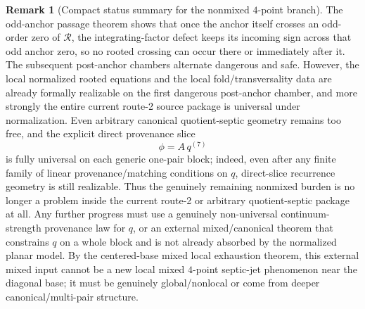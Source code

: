 \documentclass[11pt,a4paper]{amsart}
\theoremstyle{plain}
\theoremstyle{definition}
\newtheorem{remark}[theorem]{Remark}
\begin{document}
\begin{remark}[Compact status summary for the nonmixed $4$-point branch]
The odd-anchor passage theorem shows that once the anchor itself crosses an
odd-order zero of $\mathcal R$, the integrating-factor defect keeps its incoming
sign across that odd anchor zero, so no rooted crossing can occur there or
immediately after it. The subsequent post-anchor chambers alternate dangerous
and safe. However, the local normalized rooted equations and the local
fold/transversality data are already formally realizable on the first dangerous
post-anchor chamber, and more strongly the entire current route-2 source package
is universal under normalization. Even arbitrary canonical quotient-septic
geometry remains too free, and the explicit direct provenance slice
\[
\phi=A\,q^{(7)}
\]
is fully universal on each generic one-pair block; indeed, even after any
finite family of linear provenance/matching conditions on $q$, direct-slice
recurrence geometry is still realizable. Thus the genuinely remaining nonmixed
burden is no longer a problem inside the current route-2 or arbitrary
quotient-septic package at all. Any further progress must use a genuinely
non-universal continuum-strength provenance law for $q$, or an external
mixed/canonical theorem that constrains $q$ on a whole block and is not already
absorbed by the normalized planar model. By the centered-base mixed local
exhaustion theorem, this external mixed input cannot be a new local mixed
$4$-point septic-jet phenomenon near the diagonal base; it must be genuinely
global/nonlocal or come from deeper canonical/multi-pair structure.
\end{remark}
\end{document}
